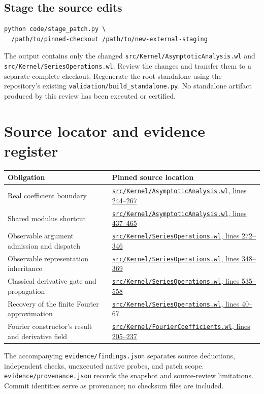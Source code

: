 \documentclass[11pt,a4paper]{article}
\newcommand{\code}[1]{\nolinkurl{#1}}
\newcommand{\src}[3]{\href{https://github.com/VladimirReshetnikov/Asymptotic/blob/651f2029d0b2cd4da9e4dfdf1f4275a124d23b99/#1\#L#2-L#3}{\code{#1}, lines #2--#3}}
\begin{document}
\subsection{Stage the source edits}
\begin{lstlisting}
python code/stage_patch.py \
  /path/to/pinned-checkout /path/to/new-external-staging
\end{lstlisting}
The output contains only the changed \code{src/Kernel/AsymptoticAnalysis.wl} and \code{src/Kernel/SeriesOperations.wl}. Review the changes and transfer them to a separate complete checkout. Regenerate the root standalone using the repository's existing \code{validation/build_standalone.py}. No standalone artifact produced by this review has been executed or certified.

\section{Source locator and evidence register}
\begin{longtable}{L{36mm}L{109mm}}
\toprule
Obligation & Pinned source location\\
\midrule
\endhead
Real coefficient boundary & \src{src/Kernel/AsymptoticAnalysis.wl}{244}{267}\\[5pt]
Shared modulus shortcut & \src{src/Kernel/AsymptoticAnalysis.wl}{437}{465}\\[5pt]
Observable argument admission and dispatch & \src{src/Kernel/SeriesOperations.wl}{272}{346}\\[5pt]
Observable representation inheritance & \src{src/Kernel/SeriesOperations.wl}{348}{369}\\[5pt]
Classical derivative gate and propagation & \src{src/Kernel/SeriesOperations.wl}{535}{558}\\[5pt]
Recovery of the finite Fourier approximation & \src{src/Kernel/SeriesOperations.wl}{40}{67}\\[5pt]
Fourier constructor's result and derivative field & \src{src/Kernel/FourierCoefficients.wl}{205}{237}\\
\bottomrule
\end{longtable}

The accompanying \code{evidence/findings.json} separates source deductions, independent checks, unexecuted native probes, and patch scope. \code{evidence/provenance.json} records the snapshot and source-review limitations. Commit identities serve as provenance; no checksum files are included.
\end{document}
